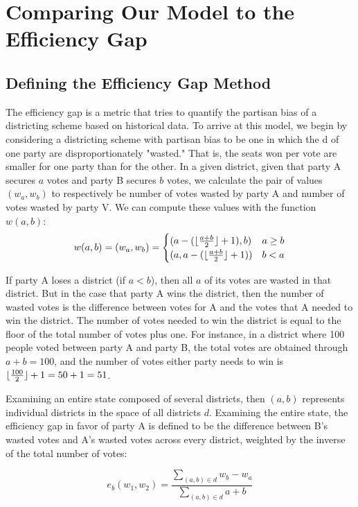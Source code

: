 \documentclass[12pt]{article}
\DeclarePairedDelimiter\floor{\lfloor}{\rfloor}
\begin{document}
\section{Comparing Our Model to the Efficiency Gap}
\subsection{Defining the Efficiency Gap Method}
    The efficiency gap is a metric that tries to quantify the partisan bias of a districting scheme based on historical data. To arrive at this model, we begin by considering a districting scheme with partisan bias to be one in which the d of one party are disproportionately "wasted." That is, the seats won per vote are smaller for one party than for the other. In a given district, given that party A secures \(a\) votes and party B secures \(b\) votes, we calculate the pair of values \((w_a, w_b)\) to respectively be number of votes wasted by party A and number of votes wasted by party V. We can compute these values with the function \(w(a,b )\):
    \[
        w(a,b)= (w_a, w_b) = \begin{cases}
        (a-(\floor{\frac{a+b}{2}}+1), b) & a\geq b\\
        (a, a-(\floor{\frac{a+b}{2}}+1)) & b < a
        \end{cases}
    \]
    \par
    If party A loses a district (if \(a<b\)), then all \(a\) of its votes are wasted in that district. But in the case that party A wins the district, then the number of wasted votes is the difference between votes for A and the votes that A needed to win the district. The number of votes needed to win the district is equal to the floor of the total number of votes plus one. For instance, in a district where 100 people voted between party A and party B, the total votes are obtained through \(a+b=100\), and the number of votes either party needs to win is \(\floor{\frac{100}{2}}+1=50+1=51\).
    \par
    Examining an entire state composed of several districts, then \((a,b)\) represents individual districts in the space of all districts \(d\). Examining the entire state, the efficiency gap in favor of party A is defined to be the difference between B's wasted votes and A's wasted votes across every district, weighted by the inverse of the total number of votes:
    
    \[e_b(w_1, w_2) = \frac{\sum_{(a,b)\in d}{w_b-w_a}}{\sum_{(a,b)\in d}{a+b}}\]
    
\end{document}
